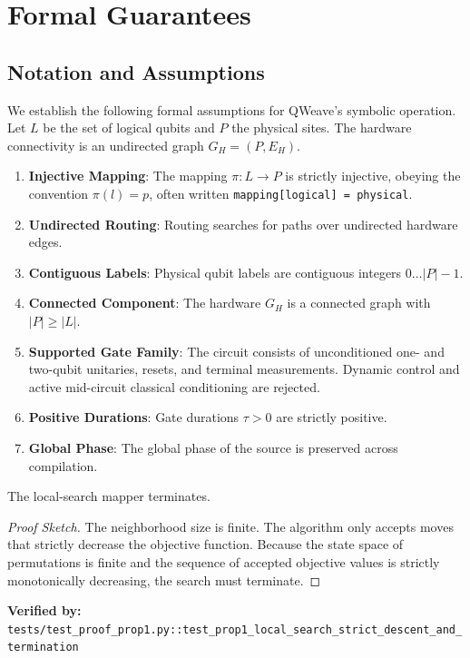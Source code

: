 \section{Formal Guarantees}
\label{sec:formal_guarantees}

\subsection{Notation and Assumptions}
We establish the following formal assumptions for QWeave's symbolic operation. Let $L$ be the set of logical qubits and $P$ the physical sites. The hardware connectivity is an undirected graph $G_H=(P, E_H)$. 

\begin{enumerate}
    \item \label{A:injective} \textbf{Injective Mapping}: The mapping $\pi: L \to P$ is strictly injective, obeying the convention $\pi(l) = p$, often written \texttt{mapping[logical] = physical}.
    \item \label{A:undirected} \textbf{Undirected Routing}: Routing searches for paths over undirected hardware edges.
    \item \label{A:contiguous} \textbf{Contiguous Labels}: Physical qubit labels are contiguous integers $0 \dots |P|-1$.
    \item \label{A:connected} \textbf{Connected Component}: The hardware $G_H$ is a connected graph with $|P| \ge |L|$.
    \item \label{A:gate_family} \textbf{Supported Gate Family}: The circuit consists of unconditioned one- and two-qubit unitaries, resets, and terminal measurements. Dynamic control and active mid-circuit classical conditioning are rejected.
    \item \label{A:durations} \textbf{Positive Durations}: Gate durations $\tau > 0$ are strictly positive.
    \item \label{A:global_phase} \textbf{Global Phase}: The global phase of the source is preserved across compilation.
\end{enumerate}

\begin{proposition}
The local-search mapper terminates.
\end{proposition}
\begin{proof}[Proof Sketch]
The neighborhood size is finite. The algorithm only accepts moves that strictly decrease the objective function. Because the state space of permutations is finite and the sequence of accepted objective values is strictly monotonically decreasing, the search must terminate.
\end{proof}
\noindent \textbf{Verified by:} \texttt{tests/test\_proof\_prop1.py::test\_prop1\_local\_search\_strict\_descent\_and\_termination}

